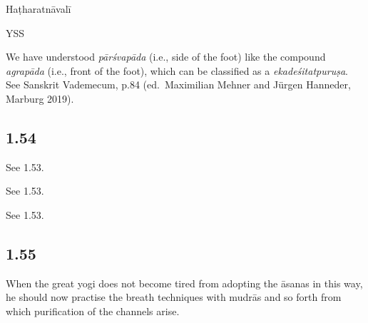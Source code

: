 \begin{ekdosis}
\begin{testimonia}[hp01_053]
Haṭharatnāvalī

\begin{versinnote}
\end{versinnote}

YSS

\begin{versinnote}
\end{versinnote}

\end{testimonia}

\begin{philcomm}[hp01_053]
We have understood \emph{pārśvapāda} (i.e., side of the foot) like the compound \emph{agrapāda} (i.e., front of the foot), which can be classified as a \emph{ekadeśitatpuruṣa}. See Sanskrit Vademecum, p.84 (ed.\ Maximilian Mehner and Jürgen Hanneder, Marburg 2019).

\end{philcomm}


\subsection*{1.54}
\begin{sources}[hp01_054]
See 1.53.
\end{sources}

\begin{testimonia}[hp01_054]
See 1.53.
\end{testimonia}

\begin{philcomm}[hp01_054]
See 1.53.
\end{philcomm}

\subsection*{1.55}
\begin{translation}[hp01_055]
When the great yogi does not become tired from adopting the āsanas in this way, he should now practise the breath techniques with mudrās and so forth from which purification of the channels arise.
\end{translation}


\end{ekdosis}
